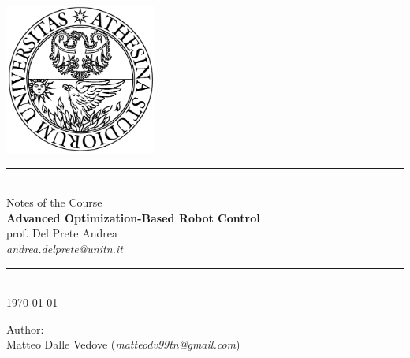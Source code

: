 \thispagestyle{empty}
\begin{center}
	$\quad$\vspace{1cm} 
	
	\includegraphics[width=5cm]{Images/logo} \vspace{2cm}
	
	\rule{7cm}{1pt} \vspace{1cm} \\
	{\Large Notes of the Course} \vspace{0.5cm} \\
	{{\LARGE \bfseries Advanced Optimization-Based Robot Control}} \vspace{0.5cm} \\
	{\Large prof. Del Prete Andrea } \vspace{2mm} \\ \textit{andrea.delprete@unitn.it} 
	\vspace{1cm} \\ \rule{7cm}{1pt} \vspace{1cm} \\
	
	{\large \today}
	
	\vspace{3cm}
	
	Author: \vspace{2mm} \\
	Matteo Dalle Vedove (\textit{matteodv99tn@gmail.com})
	
\end{center}